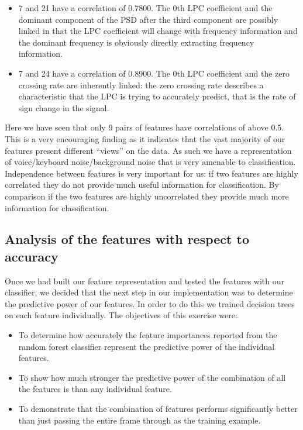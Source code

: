 \documentclass[ %
                    author={Sam Phippen},
                supervisor={Dr. Rafal Bogacz},
                     title={Real time voice activity detectors in noisy personal computing environments},
                  subtitle={},
                    degree={MEng},
                      year={2012} ]{thesis}
\begin{document}
\begin{itemize}
    \item 7 and 21 have a correlation of 0.7800. The 0th LPC coefficient and the
        dominant component of the PSD after the third component are possibly
        linked in that the LPC coefficient will change with frequency
        information and the dominant frequency is obviously directly extracting
        frequency information.

    \item 7 and 24 have a correlation of 0.8900. The 0th LPC coefficient and the
        zero crossing rate are inherently linked: the zero crossing rate
        describes a characteristic that the LPC is trying to accurately
        predict, that is the rate of sign change in the signal.

\end{itemize}

Here we have seen that only 9 pairs of features have correlations of above 0.5.
This is a very encouraging finding as it indicates that the vast majority of
our features present different ``views'' on the data. As such we have a
representation of voice/keyboard noise/background noise that is very amenable
to classification. Independence between features is very important for us: if
two features are highly correlated they do not provide much useful information
for classification. By comparison if the two features are highly uncorrelated
they provide much more information for classification.

\subsection{Analysis of the features with respect to accuracy}

Once we had built our feature representation and tested the features with our
classifier, we decided that the next step in our implementation was to
determine the predictive power of our features. In order to do this we trained
decision trees on each feature individually. The objectives of this exercise were:

\begin{itemize}

    \item To determine how accurately the feature importances reported from the random
        forest classifier represent the predictive power of the individual features.

    \item To show how much stronger the predictive power of the
        combination of all the features is than any individual feature.


    \item To demonstrate that the combination of features performs
        significantly better than just passing the entire frame through as the training
        example.

\end{itemize}
\end{document}
